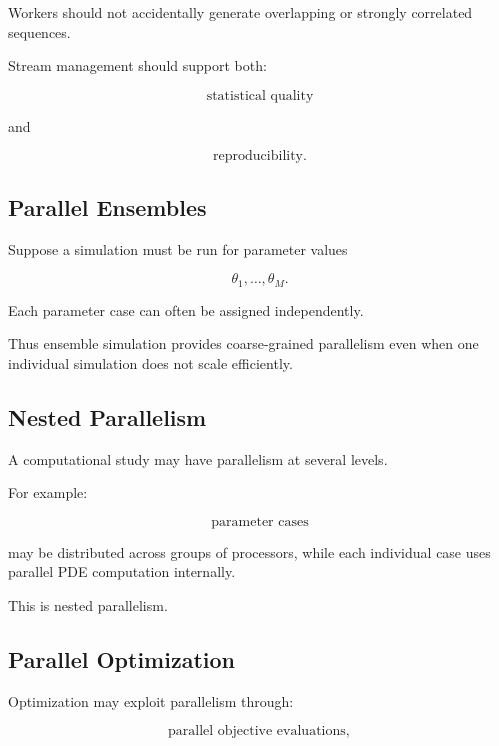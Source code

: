 Workers should not accidentally generate overlapping or strongly
correlated sequences.

Stream management should support both:

\[
\boxed{
\text{statistical quality}
}
\]

and

\[
\boxed{
\text{reproducibility}.
}
\]

\subsection{Parallel Ensembles}
\label{subsec:hpmc-parallel-ensembles}

Suppose a simulation must be run for parameter values

\[
\theta_1,\ldots,\theta_M.
\]

Each parameter case can often be assigned independently.

Thus ensemble simulation provides coarse-grained parallelism even when one
individual simulation does not scale efficiently.

\subsection{Nested Parallelism}
\label{subsec:nested-parallelism}

A computational study may have parallelism at several levels.

For example:

\[
\boxed{
\text{parameter cases}
}
\]

may be distributed across groups of processors, while each individual case
uses parallel PDE computation internally.

This is nested parallelism.

\subsection{Parallel Optimization}
\label{subsec:hpmc-parallel-optimization}

Optimization may exploit parallelism through:

\[
\boxed{
\text{parallel objective evaluations},
}
\]

